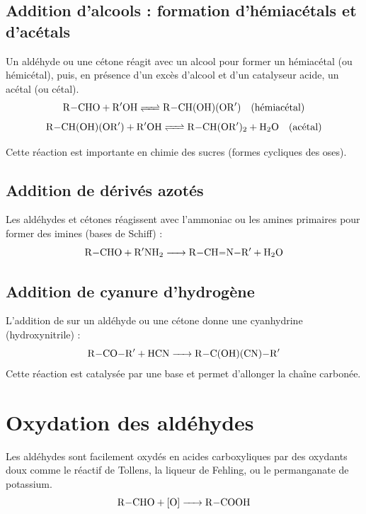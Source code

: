 \subsection{Addition d'alcools : formation d'hémiacétals et d'acétals}

\begin{propriete}
Un aldéhyde ou une cétone réagit avec un alcool  pour former un hémiacétal (ou hémicétal), puis, en présence d'un excès d'alcool et d'un catalyseur acide, un acétal (ou cétal).
\[
\ce{R-CHO + R$'$OH <=> R-CH(OH)(OR$'$)} \quad \text{(hémiacétal)}
\]
\[
\ce{R-CH(OH)(OR$'$) + R$'$OH <=> R-CH(OR$'$)2 + H2O} \quad \text{(acétal)}
\]
\end{propriete}

\begin{remarque}
Cette réaction est importante en chimie des sucres (formes cycliques des oses).
\end{remarque}

\subsection{Addition de dérivés azotés}

\begin{propriete}
Les aldéhydes et cétones réagissent avec l'ammoniac  ou les amines primaires  pour former des imines (bases de Schiff) :
\[
\ce{R-CHO + R$'$NH2 -> R-CH=N-R$'$ + H2O}
\]
\end{propriete}

\subsection{Addition de cyanure d'hydrogène}

\begin{propriete}[Cyanhydrine]
L'addition de  sur un aldéhyde ou une cétone donne une cyanhydrine (hydroxynitrile) :
\[
\ce{R-CO-R$'$ + HCN -> R-C(OH)(CN)-R$'$}
\]
Cette réaction est catalysée par une base et permet d'allonger la chaîne carbonée.
\end{propriete}

\section{Oxydation des aldéhydes}

\begin{propriete}
Les aldéhydes sont facilement oxydés en acides carboxyliques par des oxydants doux comme le réactif de Tollens, la liqueur de Fehling, ou le permanganate de potassium.
\[
\ce{R-CHO + [O] -> R-COOH}
\]
\end{propriete}

